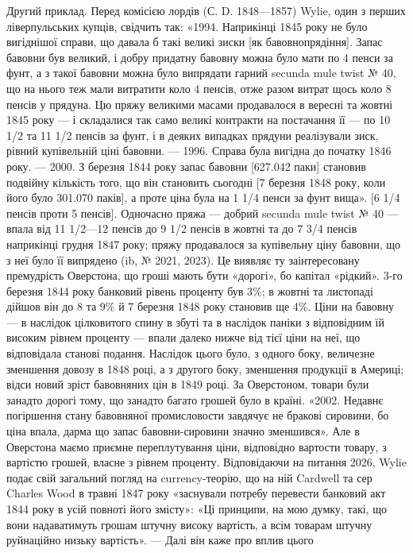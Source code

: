 Другий приклад. Перед комісією лордів (С. D. 1848—1857) Wylie, один
з    перших ліверпульських купців, свідчить так: «1994. Наприкінці 1845 року
не було вигіднішої справи, що давала б такі великі зиски [як бавовнопрядіння].
Запас бавовни був великий, і добру придатну бавовну можна було мати по
4    пенси за фунт, а з такої бавовни можна було випрядати гарний secunda
mule twist № 40, що на нього теж мали витратити коло 4 пенсів, отже разом
витрат щось коло 8 пенсів у прядуна. Цю пряжу великими масами продавалося
в вересні та жовтні 1845 року — і складалися так само великі контракти на
постачання її — по 10 1/2 та 11 1/2 пенсів за фунт, і в деяких випадках прядуни
реалізували зиск, рівний купівельній ціні бавовни. — 1996. Справа була вигідна
до початку 1846 року. — 2000. З березня 1844 року запас бавовни [627.042 паки]
становив подвійну кількість того, що він становить сьогодні [7 березня 1848 року,
коли його було 301.070 паків], а проте ціна була на 1 1/4 пенси за фунт вища».
[6 1/4 пенсів проти 5 пенсів]. Одночасно пряжа — добрий secunda mule twist
№ 40 — впала від 11 1/2—12 пенсів до 9 1/2 пенсів в жовтні та до 7 3/4 пенсів
наприкінці грудня 1847 року; пряжу продавалося за купівельну ціну бавовни,
що з неї було її випрядено (ib, № 2021, 2023). Це виявляє ту заінтересовану
премудрість Оверстона, що гроші мають бути «дорогі», бо капітал «рідкий». 3-го березня
1844 року банковий рівень проценту був 3\%; в жовтні та листопаді
дійшов він до 8 та 9\% й 7 березня 1848 року становив ще 4\%. Ціни на бавовну
— в наслідок цілковитого спину в збуті та в наслідок паніки з відповідним
їй високим рівнем проценту — впали далеко нижче від тієї ціни на неї,
що відповідала станові подання. Наслідок цього було, з одного боку, величезне
зменшення довозу в 1848 році, а з другого боку, зменшення продукції в Америці;
відси новий зріст бавовняних цін в 1849 році.
За Оверстоном, товари були занадто дорогі тому, що занадто багато грошей
було в країні.
«2002. Недавнє погіршення стану бавовняної промисловости завдячує не
бракові сировини, бо ціна впала, дарма що запас бавовни-сировини значно
зменшився». Але в Оверстона маємо приємне переплутування ціни, відповідно
вартости товару, з вартістю грошей, власне з рівнем проценту. Відповідаючи на
питання 2026, Wylie подає свій загальний погляд на currency-теорію, що на
ній Cardwell та сер Charles Wood в травні 1847 року «заснували потребу перевести
банковий акт 1844 року в усій повноті його змісту»: «Ці принципи, на
мою думку, такі, що вони надаватимуть грошам штучну високу вартість, а всім
товарам штучну руйнаційно низьку вартість». — Далі він каже про вплив цього
